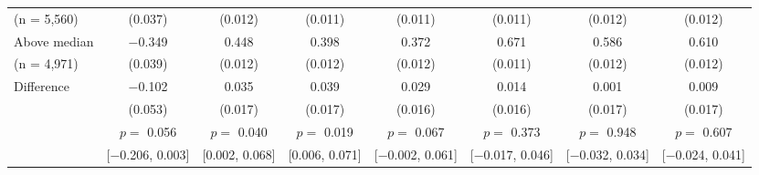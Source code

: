 \begin{tabular}[t]{lccccccc}
\hspace{2em}(n = 5,560) & (\num{0.037}) & (\num{0.012}) & (\num{0.011}) & (\num{0.011}) & (\num{0.011}) & (\num{0.012}) & (\num{0.012})\\
\hspace{1em} Above median & \num{-0.349} & \num{0.448} & \num{0.398} & \num{0.372} & \num{0.671} & \num{0.586} & \num{0.610}\\
\hspace{2em}(n = 4,971) & (\num{0.039}) & (\num{0.012}) & (\num{0.012}) & (\num{0.012}) & (\num{0.011}) & (\num{0.012}) & (\num{0.012})\\\cmidrule(lr){2-8}
\hspace{1em} Difference & \num{-0.102} & \num{0.035} & \num{0.039} & \num{0.029} & \num{0.014} & \num{0.001} & \num{0.009}\\
\hspace{2em} & (\num{0.053}) & (\num{0.017}) & (\num{0.017}) & (\num{0.016}) & (\num{0.016}) & (\num{0.017}) & (\num{0.017})\\
 & $p =$ \num{0.056} & $p =$ \num{0.040} & $p =$ \num{0.019} & $p =$ \num{0.067} & $p =$ \num{0.373} & $p =$ \num{0.948} & $p =$ \num{0.607}\\
 & {}[\num{-0.206}, \num{0.003}] & {}[\num{0.002}, \num{0.068}] & {}[\num{0.006}, \num{0.071}] & {}[\num{-0.002}, \num{0.061}] & {}[\num{-0.017}, \num{0.046}] & {}[\num{-0.032}, \num{0.034}] & {}[\num{-0.024}, \num{0.041}]\\
\end{tabular}
